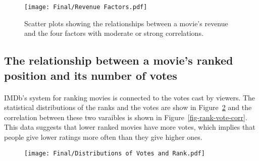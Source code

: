 \begin{multicols}{2}
                \begin{figure}[H]
                    \centering
                    \texttt{[image: Final/Revenue Factors.pdf]}
                    \caption{
                        Scatter plots showing the relationships between a movie's revenue and the four
                        factors with moderate or strong correlations.
                    }\label{fig-revenue-factors}
                \end{figure}
        \end{multicols}

    \subsection{The relationship between a movie's ranked position and its number of votes}
        \begin{multicols}{2}
            \paragraph{}
                IMDb's system for ranking movies is connected to the votes cast by viewers.
                The statistical distributions of the ranks and the votes are show in
                    Figure~\ref{fig-rank-vote-dist} and the correlation between these two varaibles
                    is shown in Figure~\ref{fig-rank-vote-corr}.
                This data suggests that lower ranked movies have more votes, which implies that
                    people give lower ratings more often than they give higher ones.

                \begin{figure}[H]
                    \centering
                    \texttt{[image: Final/Distributions of Votes and Rank.pdf]}
                    \caption{}\label{fig-rank-vote-dist}
                \end{figure}
        \end{multicols}

    \subsection*{}
        \paragraph{}

